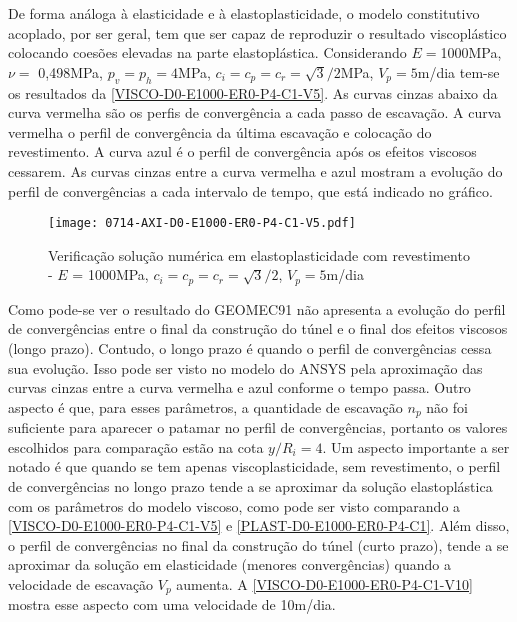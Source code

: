 De forma análoga à elasticidade e à elastoplasticidade, o modelo constitutivo acoplado, por ser geral, tem que ser capaz de reproduzir o resultado viscoplástico colocando coesões elevadas na parte elastoplástica.  Considerando $E =$1000MPa, $\nu =$ 0,498MPa, $p_v = p_h = 4$MPa, $c_i=c_p=c_r = \sqrt{3}/2$MPa, $V_p = 5$m/dia tem-se os resultados da \autoref{VISCO-D0-E1000-ER0-P4-C1-V5}. As curvas cinzas abaixo da curva vermelha são os perfis de convergência a cada passo de escavação. A curva vermelha o perfil de convergência da última escavação e colocação do revestimento. A curva azul é o perfil de convergência após os efeitos viscosos cessarem. As curvas cinzas entre a curva vermelha e azul mostram a evolução do perfil de convergências a cada intervalo de tempo, que está indicado no gráfico.
\begin{figure}[H]
	\begin{center}
		\texttt{[image: 0714-AXI-D0-E1000-ER0-P4-C1-V5.pdf]}
	\end{center}
	\caption{\label{VISCO-D0-E1000-ER0-P4-C1-V5}Verificação solução numérica em elastoplasticidade com revestimento - $E$ = 1000MPa, $c_i=c_p=c_r=\sqrt{3}/2$, $V_p=5$m/dia}
\end{figure}
Como pode-se ver o resultado do GEOMEC91 não apresenta a evolução do perfil de convergências entre o final da construção do túnel e o final dos efeitos viscosos (longo prazo). Contudo, o longo prazo é quando o perfil de convergências cessa sua evolução. Isso pode ser visto no modelo do ANSYS pela aproximação das curvas cinzas entre a curva vermelha e azul conforme o tempo passa. Outro aspecto é que, para esses parâmetros, a quantidade de escavação $n_p$ não foi suficiente para aparecer o patamar no perfil de convergências, portanto os valores escolhidos para comparação estão na cota $y/R_i=4$. Um aspecto importante a ser notado é que quando se tem apenas viscoplasticidade, sem revestimento, o perfil de convergências no longo prazo tende a se aproximar da solução elastoplástica com os parâmetros do modelo viscoso, como pode ser visto comparando a \autoref{VISCO-D0-E1000-ER0-P4-C1-V5} e \autoref{PLAST-D0-E1000-ER0-P4-C1}. Além disso, o perfil de convergências no final da construção do túnel (curto prazo), tende a se aproximar da solução em elasticidade (menores convergências) quando a velocidade de escavação $V_p$ aumenta. A \autoref{VISCO-D0-E1000-ER0-P4-C1-V10} mostra esse aspecto com uma velocidade de 10m/dia.

